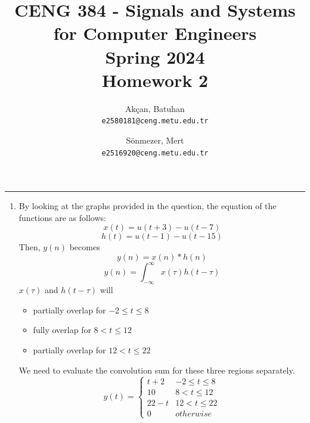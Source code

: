 \documentclass[10pt,a4paper, margin=1in]{article}
\author{
  Akçan, Batuhan\\
  \texttt{e2580181@ceng.metu.edu.tr}
  \and
  Sönmezer, Mert\\
  \texttt{e2516920@ceng.metu.edu.tr}
}
\title{CENG 384 - Signals and Systems for Computer Engineers \\
Spring 2024 \\
Homework 2}
\begin{document}
\maketitle



\noindent\rule{19cm}{1.2pt}

\begin{enumerate}

\item %
    By looking at the graphs provided in the question, the equation of the functions are as follows:
    $$x(t)=u(t+3)-u(t-7)$$
    $$h(t)=u(t-1)-u(t-15)$$
    Then, $y(n)$ becomes
    $$y(n)=x(n)*h(n)$$
    $$y(n)=\int_{-\infty}^{\infty}x(\tau)h(t-\tau)$$
    $x(\tau)$ and $h(t-\tau)$ will
    \begin{itemize}
        \item partially overlap for $-2\leq t\leq 8$
        \item fully overlap for $8< t\leq 12$
        \item partially overlap for $12< t\leq 22$
    \end{itemize}
    We need to evaluate the convolution sum for these three regions separately.
    \[ y(t) = \begin{cases} 
          t+2 & -2\leq t\leq 8 \\
          10 & 8<t\leq 12 \\
          22-t & 12<t\leq 22\\
          0 & otherwise
       \end{cases}
    \]


\end{enumerate}
\end{document}
